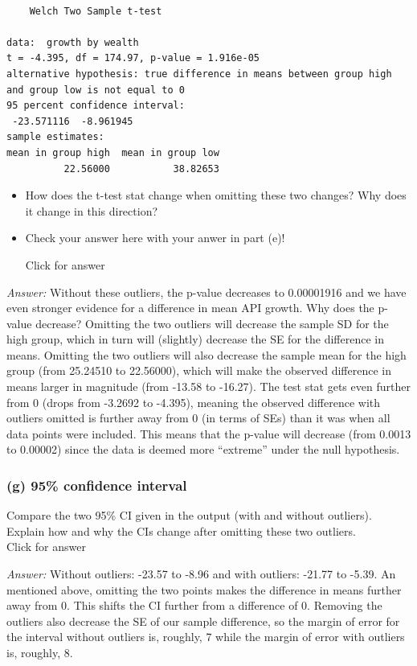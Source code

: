 \documentclass[
]{book}
\providecommand{\tightlist}{%
  \setlength{\itemsep}{0pt}\setlength{\parskip}{0pt}}
\begin{document}
\begin{verbatim}

    Welch Two Sample t-test

data:  growth by wealth
t = -4.395, df = 174.97, p-value = 1.916e-05
alternative hypothesis: true difference in means between group high and group low is not equal to 0
95 percent confidence interval:
 -23.571116  -8.961945
sample estimates:
mean in group high  mean in group low 
          22.56000           38.82653 
\end{verbatim}

\begin{itemize}
\tightlist
\item
  How does the t-test stat change when omitting these two changes? Why does it change in this direction?
\item
  Check your answer here with your anwer in part (e)!

  Click for answer
\end{itemize}

\emph{Answer:} Without these outliers, the p-value decreases to 0.00001916 and we have even stronger evidence for a difference in mean API growth. Why does the p-value decrease? Omitting the two outliers will decrease the sample SD for the high group, which in turn will (slightly) decrease the SE for the difference in means. Omitting the two outliers will also decrease the sample mean for the high group (from 25.24510 to 22.56000), which will make the observed difference in means larger in magnitude (from -13.58 to -16.27). The test stat gets even further from 0 (drops from -3.2692 to -4.395), meaning the observed difference with outliers omitted is further away from 0 (in terms of SEs) than it was when all data points were included. This means that the p-value will decrease (from 0.0013 to 0.00002) since the data is deemed more ``extreme'' under the null hypothesis.

\hypertarget{g-95-confidence-interval}{%
\subsubsection{(g) 95\% confidence interval}\label{g-95-confidence-interval}}

Compare the two 95\% CI given in the output (with and without outliers). Explain how and why the CIs change after omitting these two outliers.\\

Click for answer

\emph{Answer:} Without outliers: -23.57 to -8.96 and with outliers: -21.77 to -5.39. An mentioned above, omitting the two points makes the difference in means further away from 0. This shifts the CI further from a difference of 0. Removing the outliers also decrease the SE of our sample difference, so the margin of error for the interval without outliers is, roughly, 7 while the margin of error with outliers is, roughly, 8.
\end{document}
